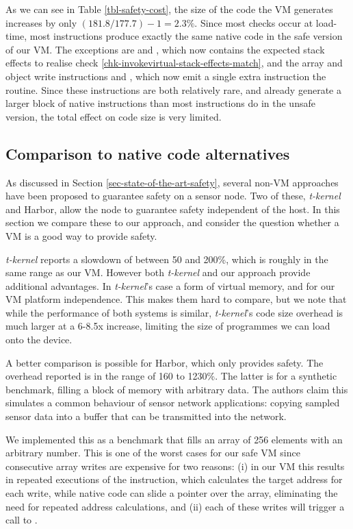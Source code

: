 As we can see in Table \ref{tbl-safety-cost}, the size of the code the VM generates increases by only $(181.8/177.7)-1=2.3\%$. Since most checks occur at load-time, most instructions produce exactly the same native code in the safe version of our VM. The exceptions are  and , which now contains the expected stack effects to realise check \ref{chk-invokevirtual-stack-effects-match}, and the array and object write instructions  and , which now emit a single extra  instruction the  routine. Since these instructions are both relatively rare, and already generate a larger block of native instructions than most instructions do in the unsafe version, the total effect on code size is very limited.

\subsection{Comparison to native code alternatives}
As discussed in Section \ref{sec-state-of-the-art-safety}, several non-VM approaches have been proposed to guarantee safety on a sensor node. Two of these, \emph{t-kernel} and Harbor, allow the node to guarantee safety independent of the host. In this section we compare these to our approach, and consider the question whether a VM is a good way to provide safety.

\emph{t-kernel} reports a slowdown of between 50 and 200\%, which is roughly in the same range as our VM. However both \emph{t-kernel} and our approach provide additional advantages. In \emph{t-kernel}'s case a form of virtual memory, and for our VM platform independence. This makes them hard to compare, but we note that while the performance of both systems is similar, \emph{t-kernel}'s code size overhead is much larger at a 6-8.5x increase, limiting the size of programmes we can load onto the device.

A better comparison is possible for Harbor, which only provides safety. The overhead reported is in the range of 160 to 1230\%. The latter is for a synthetic benchmark, filling a block of memory with arbitrary data. The authors claim this simulates a common behaviour of sensor network applications: copying sampled sensor data into a buffer that can be transmitted into the network.

We implemented this as a benchmark that fills an array of 256 elements with an arbitrary number. This is one of the worst cases for our safe VM since consecutive array writes are expensive for two reasons: (i) in our VM this results in repeated executions of the  instruction, which calculates the target address for each write, while native code can slide a pointer over the array, eliminating the need for repeated address calculations, and (ii) each of these writes will trigger a call to .

